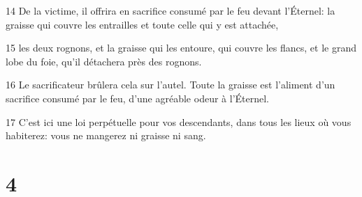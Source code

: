 \par 14 De la victime, il offrira en sacrifice consumé par le feu devant l'Éternel: la graisse qui couvre les entrailles et toute celle qui y est attachée,
\par 15 les deux rognons, et la graisse qui les entoure, qui couvre les flancs, et le grand lobe du foie, qu'il détachera près des rognons.
\par 16 Le sacrificateur brûlera cela sur l'autel. Toute la graisse est l'aliment d'un sacrifice consumé par le feu, d'une agréable odeur à l'Éternel.
\par 17 C'est ici une loi perpétuelle pour vos descendants, dans tous les lieux où vous habiterez: vous ne mangerez ni graisse ni sang.

\chapter{4}

